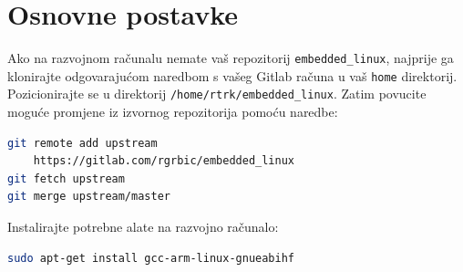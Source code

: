 \documentclass[11pt]{article}
\begin{document}
\section{Osnovne postavke}
Ako na razvojnom računalu nemate vaš repozitorij \texttt{embedded\_linux},
 najprije ga klonirajte odgovarajućom naredbom s vašeg Gitlab računa u vaš
 \texttt{home} direktorij. Pozicionirajte se u direktorij
 \texttt{/home/rtrk/embedded\_linux}. Zatim povucite moguće promjene iz
 izvornog repozitorija pomoću naredbe:
\begin{lstlisting}[language=bash]
git remote add upstream
	https://gitlab.com/rgrbic/embedded_linux
git fetch upstream
git merge upstream/master
\end{lstlisting}
Instalirajte potrebne alate na razvojno računalo:
\begin{lstlisting}[language=bash]
sudo apt-get install gcc-arm-linux-gnueabihf
\end{lstlisting}
\end{document}
